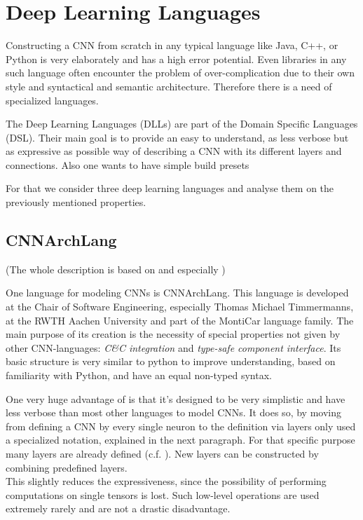 \chapter{Deep Learning Languages}\label{chapter: DLL}

Constructing a CNN from scratch in any typical language like Java, C++, or Python is very elaborately and has a high error potential. Even libraries in any such language often encounter the problem of over-complication due to their own style and syntactical and semantic architecture. Therefore there is a need of specialized languages.

The Deep Learning Languages (DLLs) are part of the Domain Specific Languages (DSL). Their main goal is to provide an easy to understand, as less verbose but as expressive as possible way of describing a CNN with its different layers and connections. Also one wants to have simple build presets

For that we consider three deep learning languages and analyse them on the previously mentioned properties.

\section{CNNArchLang}\label{sec: CNNArch}

(The whole description is based on\cite{CNNArch} and especially \cite{tim2018CNNArchLang})

One language for modeling CNNs is CNNArchLang. This language is developed at the Chair of Software Engineering, especially Thomas Michael Timmermanns,  at the RWTH Aachen University and part of the MontiCar language family. The main purpose of its creation is the necessity of special properties not given by other CNN-languages: \textit{C\&C integration} and \textit{type-safe component interface}. Its basic structure is very similar to python to improve understanding, based on familiarity with Python, and have an equal non-typed syntax. 

One very huge advantage of \cnnarch is that it's designed to be very simplistic and have less verbose %
than most other languages to model CNNs. It does so, by moving from defining a CNN by every single neuron to the definition via layers only used a specialized notation, explained in the next paragraph. For that specific purpose many layers are already defined (c.f. ). 
New layers can be constructed by combining predefined layers.\\
This slightly reduces the expressiveness, since the possibility of performing computations on single tensors is lost. Such low-level operations are used extremely rarely and are not a drastic disadvantage.


